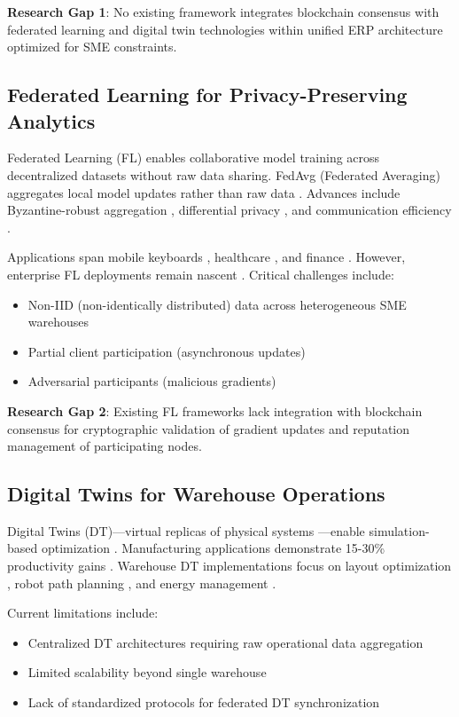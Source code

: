 \documentclass[times,10pt,twocolumn]{jucs2e}
\begin{document}
\textbf{Research Gap 1}: No existing framework integrates blockchain consensus with federated learning and digital twin technologies within unified ERP architecture optimized for SME constraints.

\subsection{Federated Learning for Privacy-Preserving Analytics}

Federated Learning (FL) \cite{McMahan2017} enables collaborative model training across decentralized datasets without raw data sharing. FedAvg (Federated Averaging) aggregates local model updates rather than raw data \cite{McMahan2017}. Advances include Byzantine-robust aggregation \cite{Blanchard2017}, differential privacy \cite{Geyer2017}, and communication efficiency \cite{Konecny2016}.

Applications span mobile keyboards \cite{Hard2018}, healthcare \cite{Sheller2020}, and finance \cite{Yang2019}. However, enterprise FL deployments remain nascent \cite{Kairouz2021}. Critical challenges include:
\begin{itemize}
\item Non-IID (non-identically distributed) data across heterogeneous SME warehouses
\item Partial client participation (asynchronous updates)
\item Adversarial participants (malicious gradients)
\end{itemize}

\textbf{Research Gap 2}: Existing FL frameworks lack integration with blockchain consensus for cryptographic validation of gradient updates and reputation management of participating nodes.

\subsection{Digital Twins for Warehouse Operations}

Digital Twins (DT)---virtual replicas of physical systems \cite{Grieves2014}---enable simulation-based optimization \cite{Tao2019}. Manufacturing applications demonstrate 15-30\% productivity gains \cite{Qi2021}. Warehouse DT implementations focus on layout optimization \cite{Ivanov2020}, robot path planning \cite{Li2022}, and energy management \cite{Park2023}.

Current limitations include:
\begin{itemize}
\item Centralized DT architectures requiring raw operational data aggregation
\item Limited scalability beyond single warehouse
\item Lack of standardized protocols for federated DT synchronization
\end{itemize}
\end{document}
